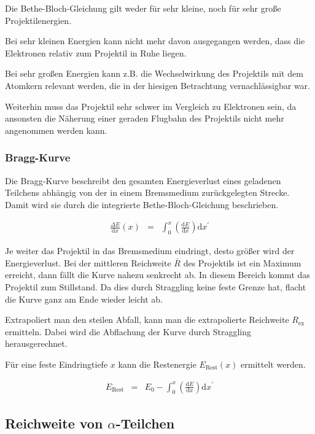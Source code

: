\documentclass[12pt,a4paper]{scrartcl}
\numberwithin{equation}{section} %
\renewcommand{\[}{} %
\renewcommand{\]}{\noindent} %
\begin{document}
Die Bethe-Bloch-Gleichung gilt weder für sehr kleine, noch für sehr
große Projektilenergien.

Bei sehr kleinen Energien kann nicht mehr davon ausgegangen werden, dass
die Elektronen relativ zum Projektil in Ruhe liegen.

Bei sehr großen Energien kann z.B. die Wechselwirkung des Projektils mit
dem Atomkern relevant werden, die in der hiesigen Betrachtung
vernachlässigbar war.

Weiterhin muss das Projektil sehr schwer im Vergleich zu Elektronen
sein, da ansonsten die Näherung einer geraden Flugbahn des Projektils
nicht mehr angenommen werden kann.

\hypertarget{bragg-kurve}{%
\subsubsection{Bragg-Kurve}\label{bragg-kurve}}

Die Bragg-Kurve beschreibt den gesamten Energieverlust eines geladenen
Teilchens abhängig von der in einem Bremsmedium zurückgelegten Strecke.
Damit wird sie durch die integrierte Bethe-Bloch-Gleichung beschrieben.

\[
\begin{eqnarray}
    \frac{\Delta E}{\mathrm dx}(x) &=&
        \int_0^x \left(\frac{\mathrm dE}{\mathrm dx}\right) \mathrm dx^\prime
\end{eqnarray}
\]

Je weiter das Projektil in das Bremsmedium eindringt, desto größer wird
der Energieverlust. Bei der mittleren Reichweite \(\bar R\) des
Projektils ist ein Maximum erreicht, dann fällt die Kurve nahezu
senkrecht ab. In diesem Bereich kommt das Projektil zum Stillstand. Da
dies durch Straggling keine feste Grenze hat, flacht die Kurve ganz am
Ende wieder leicht ab.

Extrapoliert man den steilen Abfall, kann man die extrapolierte
Reichweite \(R_\mathrm{ex}\) ermitteln. Dabei wird die Abflachung der
Kurve durch Straggling herausgerechnet.

Für eine feste Eindringtiefe \(x\) kann die Restenergie
\(E_\mathrm{Rest}(x)\) ermittelt werden.

\[
\begin{eqnarray}
    E_\mathrm{Rest}
        &=& E_0
        - \int_0^x \left(\frac{\mathrm dE}{\mathrm dx}\right) \mathrm dx^\prime
        \label{Restenergie}
\end{eqnarray}
\]

\hypertarget{reichweite-von-alpha-teilchen}{%
\subsection{\texorpdfstring{Reichweite von
\(\alpha\)-Teilchen}{Reichweite von \textbackslash alpha-Teilchen}}\label{reichweite-von-alpha-teilchen}}
\end{document}
